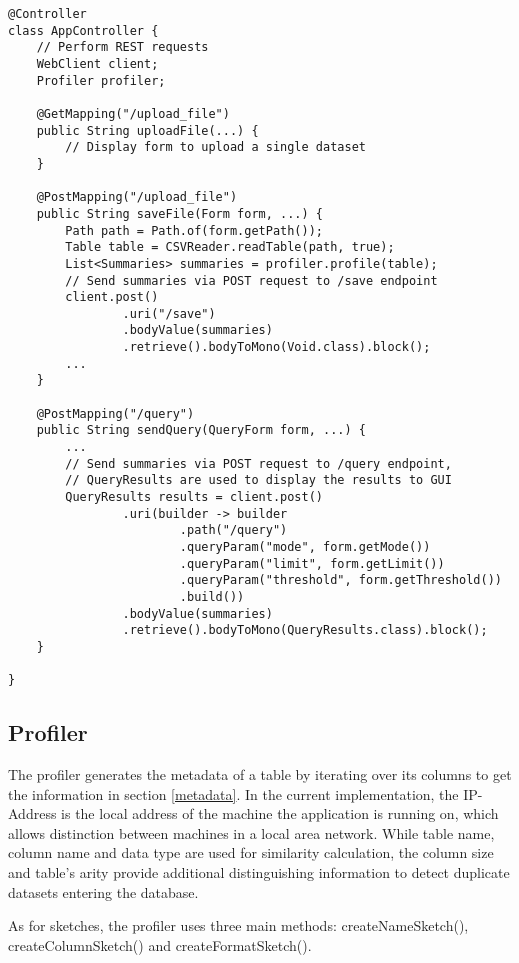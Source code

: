 \begin{lstlisting}[caption={Preview of the controller class}, label=lst:appcontroller]
@Controller
class AppController {
    // Perform REST requests
    WebClient client;
    Profiler profiler;

    @GetMapping("/upload_file")
    public String uploadFile(...) {
        // Display form to upload a single dataset
    }

    @PostMapping("/upload_file")
    public String saveFile(Form form, ...) {
        Path path = Path.of(form.getPath());
        Table table = CSVReader.readTable(path, true);
        List<Summaries> summaries = profiler.profile(table);
        // Send summaries via POST request to /save endpoint
        client.post()
                .uri("/save")
                .bodyValue(summaries)
                .retrieve().bodyToMono(Void.class).block();
        ...
    }

    @PostMapping("/query")
    public String sendQuery(QueryForm form, ...) {
        ...
        // Send summaries via POST request to /query endpoint,
        // QueryResults are used to display the results to GUI
        QueryResults results = client.post()
                .uri(builder -> builder
                        .path("/query")
                        .queryParam("mode", form.getMode())
                        .queryParam("limit", form.getLimit())
                        .queryParam("threshold", form.getThreshold())
                        .build())
                .bodyValue(summaries)
                .retrieve().bodyToMono(QueryResults.class).block();
    }
    
}
\end{lstlisting}

\subsection{Profiler}\label{profiler}

The profiler generates the metadata of a table by iterating over its columns to get the information in section \ref{metadata}. In the current implementation, the IP-Address is the local address of the machine the application is running on, which allows distinction between machines in a local area network. While table name, column name and data type are used for similarity calculation, the column size and table's arity provide additional distinguishing information to detect duplicate datasets entering the database.

As for sketches, the profiler uses three main methods: createNameSketch(), createColumnSketch() and createFormatSketch().

